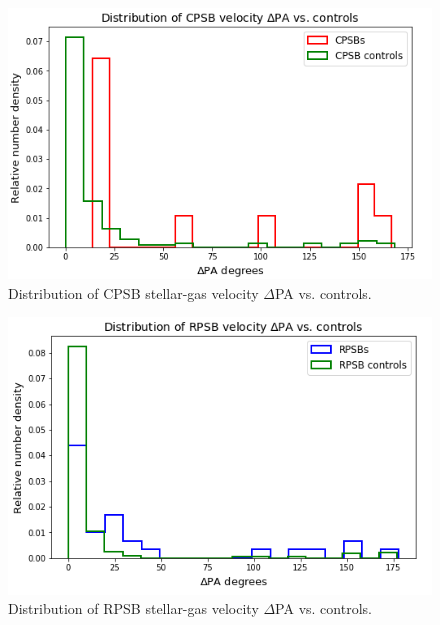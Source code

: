 \begin{figure}
    \centering
    \includegraphics[width=\columnwidth]{images/JupyterPlots/Distribution-of-CPSB-dPA-vs-controls.png}
    \caption{Distribution of CPSB stellar-gas velocity $\Delta$PA vs. controls.}
    \label{fig:CPSBvsControlDeltaPAs}
\end{figure}

\begin{figure}
    \centering
    \includegraphics[width=\columnwidth]{images/JupyterPlots/Distribution-of-RPSB-dPA-vs-controls.png}
    \caption{Distribution of RPSB stellar-gas velocity $\Delta$PA vs. controls.}
    \label{fig:RPSBvsControlDeltaPAs}
\end{figure}


